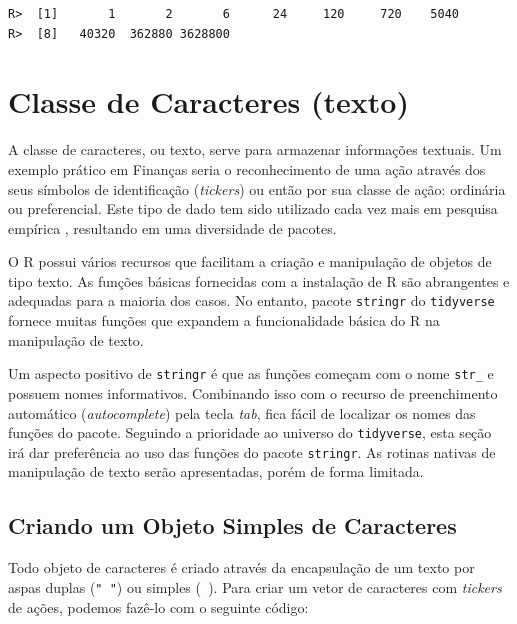 \documentclass[
  11pt,
]{book}
\begin{document}
\begin{verbatim}
R>  [1]       1       2       6      24     120     720    5040
R>  [8]   40320  362880 3628800
\end{verbatim}

\hypertarget{classe-de-caracteres-texto}{%
\section{Classe de Caracteres (texto)}\label{classe-de-caracteres-texto}}

A classe de caracteres, ou texto, serve para armazenar informações textuais. Um exemplo prático em Finanças seria o reconhecimento de uma ação através dos seus símbolos de identificação (\emph{tickers}) ou então por sua classe de ação: ordinária ou preferencial. Este tipo de dado tem sido utilizado cada vez mais em pesquisa empírica \citep{gentzkow2017text}, resultando em uma diversidade de pacotes.

O R possui vários recursos que facilitam a criação e manipulação de objetos de tipo texto. As funções básicas fornecidas com a instalação de R são abrangentes e adequadas para a maioria dos casos. No entanto, pacote \texttt{stringr} \citep{R-stringr} do \texttt{tidyverse} fornece muitas funções que expandem a funcionalidade básica do R na manipulação de texto.

Um aspecto positivo de \texttt{stringr} é que as funções começam com o nome \texttt{str\_} e possuem nomes informativos. Combinando isso com o recurso de preenchimento automático (\emph{autocomplete}) pela tecla \emph{tab}, fica fácil de localizar os nomes das funções do pacote. Seguindo a prioridade ao universo do \texttt{tidyverse}, esta seção irá dar preferência ao uso das funções do pacote \texttt{stringr}. As rotinas nativas de manipulação de texto serão apresentadas, porém de forma limitada. 

\hypertarget{criando-um-objeto-simples-de-caracteres}{%
\subsection{Criando um Objeto Simples de Caracteres}\label{criando-um-objeto-simples-de-caracteres}}

Todo objeto de caracteres é criado através da encapsulação de um texto por aspas duplas (\texttt{"\ "}) ou simples (\texttt{\textquotesingle{}\ \textquotesingle{}}). Para criar um vetor de caracteres com \emph{tickers} de ações, podemos fazê-lo com o seguinte código:
\end{document}
